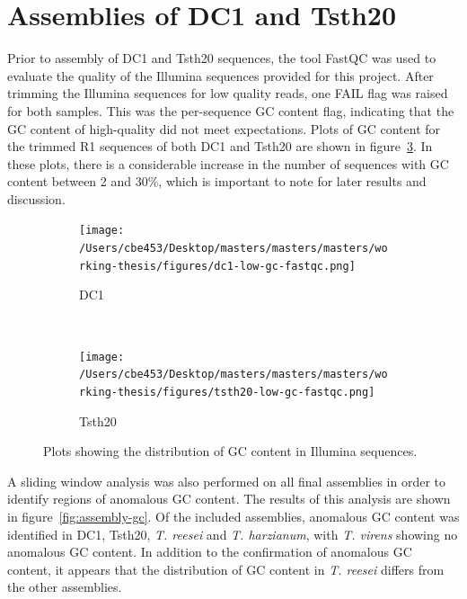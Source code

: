\section{Assemblies of DC1 and Tsth20}

Prior to assembly of DC1 and Tsth20 sequences, the tool FastQC was
used to evaluate the quality of the Illumina sequences provided for
this project. After trimming the Illumina sequences for low quality
reads, one FAIL flag was raised for both samples. This was the
per-sequence GC content flag, indicating that the GC content of
high-quality did not meet expectations. Plots of GC content for the
trimmed R1 sequences of both DC1 and Tsth20 are shown in
figure~\ref{fig:fastqc-lowgc}. In these plots, there is a considerable
increase in the number of sequences with GC content between 2 and 30\%,
which is important to note for later results and discussion.

\begin{figure}
  \centering
  \begin{subfigure}{0.8\textwidth}
    \texttt{[image: /Users/cbe453/Desktop/masters/masters/masters/working-thesis/figures/dc1-low-gc-fastqc.png]}
    \caption{DC1}
    \label{fig:dc1fastqc}
  \end{subfigure}
  \\
  \begin{subfigure}{0.8\textwidth}
    \texttt{[image: /Users/cbe453/Desktop/masters/masters/masters/working-thesis/figures/tsth20-low-gc-fastqc.png]}
    \caption{Tsth20}
    \label{fig:tsth20fastqc}
  \end{subfigure}
  \caption{Plots showing the distribution of GC content in Illumina
    sequences.}
  \label{fig:fastqc-lowgc}
\end{figure}

A sliding window analysis was also performed on all final assemblies
in order to identify regions of anomalous GC content. The results of
this analysis are shown in figure~\ref{fig:assembly-gc}. Of the
included assemblies, anomalous GC content was identified in DC1,
Tsth20, \textit{T. reesei} and \textit{T. harzianum}, with
\textit{T. virens} showing no anomalous GC content. In addition to the
confirmation of anomalous GC content, it appears that the distribution
of GC content in \textit{T. reesei} differs from the other assemblies.

